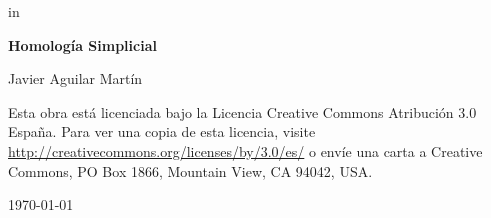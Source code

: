\documentclass[twoside]{report}
\begin{document}
 in

\thispagestyle{empty}

\begin{titlepage}
	\centering
	{\huge\bfseries Homología Simplicial \par}
	\vspace{2cm}
	{\Large Javier Aguilar Martín\par}
	\vspace{2.5cm}
	\vfill
	Esta obra está licenciada bajo la Licencia Creative Commons Atribución 3.0 España. Para ver una copia de esta licencia, visite \url{http://creativecommons.org/licenses/by/3.0/es/} o envíe una carta a Creative Commons, PO Box 1866, Mountain View, CA 94042, USA.

	{\large \today\par}
\end{titlepage}
	


\begin{center}
\end{center}



\setcounter{page}{0}

\tableofcontents








\printindex
\end{document}
